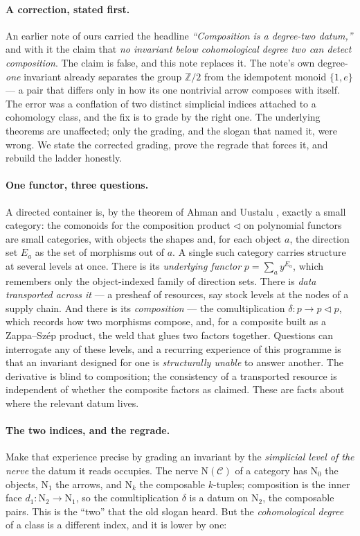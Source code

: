 \documentclass[11pt]{article}
\theoremstyle{definition}
\newcommand{\Z}{\mathbb{Z}}
\newcommand{\cC}{\mathcal{C}}
\newcommand{\lto}{\!\lhd\!}
\newcommand{\Nerve}{\mathrm{N}}
\begin{document}
\paragraph{A correction, stated first.}
An earlier note of ours carried the headline \emph{``Composition is a degree-two datum,''} and with
it the claim that \emph{no invariant below cohomological degree two can detect composition}. The
claim is false, and this note replaces it. The note's own degree-\emph{one} invariant already
separates the group $\Z/2$ from the idempotent monoid $\{1,e\}$ --- a pair that differs only in how
its one nontrivial arrow composes with itself. The error was a conflation of two distinct simplicial
indices attached to a cohomology class, and the fix is to grade by the right one. The underlying
theorems are unaffected; only the grading, and the slogan that named it, were wrong. We state the
corrected grading, prove the regrade that forces it, and rebuild the ladder honestly.

\paragraph{One functor, three questions.}
A directed container is, by the theorem of Ahman and Uustalu \cite{AhmanUustalu2016}, exactly a
small category: the comonoids for the composition product $\lhd$ on polynomial functors are small
categories, with objects the shapes and, for each object $a$, the direction set $E_a$ as the set of
morphisms out of $a$. A single such category carries structure at several levels at once. There is
its \emph{underlying functor} $p=\sum_a y^{E_a}$, which remembers only the object-indexed family of
direction sets. There is \emph{data transported across it} --- a presheaf of resources, say stock
levels at the nodes of a supply chain. And there is its \emph{composition} --- the comultiplication
$\delta\colon p\to p\lto p$, which records how two morphisms compose, and, for a composite built as a
Zappa--Sz\'ep product, the weld that glues two factors together. Questions can interrogate any of
these levels, and a recurring experience of this programme is that an invariant designed for one is
\emph{structurally unable} to answer another. The derivative is blind to composition; the
consistency of a transported resource is independent of whether the composite factors as claimed.
These are facts about where the relevant datum lives.

\paragraph{The two indices, and the regrade.}
Make that experience precise by grading an invariant by the \emph{simplicial level of the nerve} the
datum it reads occupies. The nerve $\Nerve(\cC)$ of a category has $\Nerve_0$ the objects,
$\Nerve_1$ the arrows, and $\Nerve_k$ the composable $k$-tuples; composition is the inner face
$d_1\colon\Nerve_2\to\Nerve_1$, so the comultiplication $\delta$ is a datum on $\Nerve_2$, the
composable pairs. This is the ``two'' that the old slogan heard. But the \emph{cohomological degree}
of a class is a different index, and it is lower by one:
\end{document}
